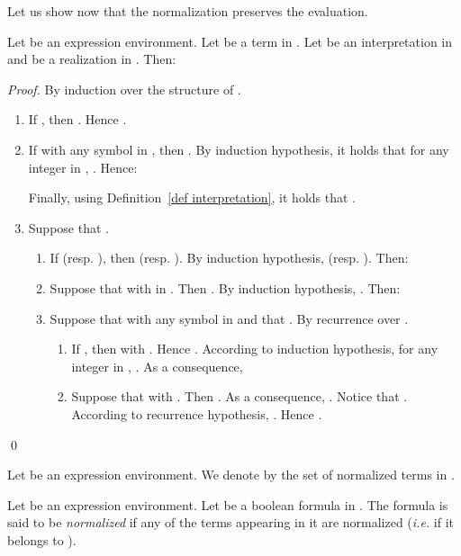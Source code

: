 \documentclass[a4paper]{llncs}
\begin{document}
  Let us show now that the normalization preserves the evaluation.
  
  \begin{proposition}\label{prop t tprim mem eval}
    Let  be an expression environment. Let  be a term in . Let  be an interpretation in  and  be a realization in . Then:
        
  \end{proposition}
  \begin{proof}
    By induction over the structure of .
    \begin{enumerate}
      \item If , then . Hence .    
      \item If  with  any symbol in , then . By induction hypothesis, it holds that for any integer  in , . Hence:
            
    Finally, using Definition~\ref{def interpretation}, it holds that .
    
    \item Suppose that .     
    \begin{enumerate}
      \item If  (resp. ), then  (resp. ). By induction hypothesis,  (resp. ). Then:
             
    \item  Suppose that  with  in . Then . By induction hypothesis, . Then:
            
    \item  Suppose that  with  any symbol in  and that . By recurrence over . 
    \begin{enumerate}
      \item  If , then  with . Hence .
     According to induction hypothesis, for any integer  in , .
     As a consequence, 
              
    \item Suppose that  with . Then . As a consequence, . Notice that . According to recurrence hypothesis,
    . Hence
    .
    \end{enumerate}
    \end{enumerate}
    \end{enumerate}    
    \qed
  \end{proof}
  
  Let  be an expression environment. We denote by  the set of normalized terms in .   
  
  \begin{definition}
    Let  be an expression environment. Let  be a boolean formula in . The formula  is said to be \emph{normalized} if any of the terms appearing in it are normalized (\emph{i.e.} if it belongs to ).
  \end{definition} 
  
\end{document}
